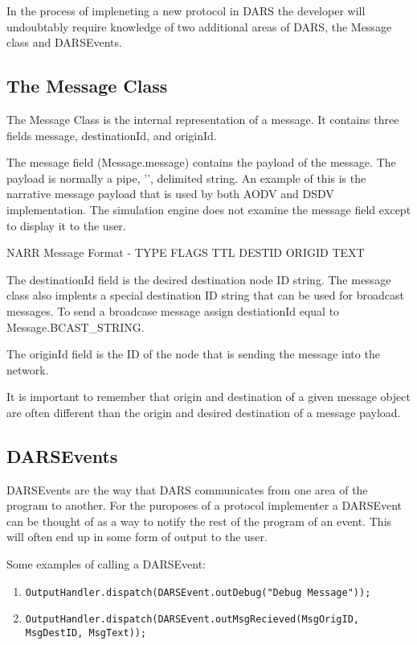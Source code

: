 \documentclass[a4paper,11pt,titlepage]{article}
\begin{document}
In the process of impleneting a new protocol in DARS the developer will undoubtably require knowledge of two additional areas of DARS, the Message class and DARSEvents.

\subsection{The Message Class}
The Message Class is the internal representation of a message. It contains three fields message, destinationId, and originId.

The message field (Message.message) contains the payload of the message. The payload is normally a pipe, '\textbar', delimited string. An example of this is the narrative message payload that is used by both AODV and DSDV implementation. The simulation engine does not examine the message field except to display it to the user.

\begin{center}
NARR Message Format - TYPE \textbar FLAGS \textbar TTL \textbar DESTID \textbar ORIGID \textbar TEXT
\end{center}

The destinationId field is the desired destination node ID string. The message class also implents a special destination ID string that can be used for broadcast messages. To send a broadcase message assign destiationId equal to Message.BCAST\_STRING.

The originId field is the ID of the node that is sending the message into the network.

It is important to remember that origin and destination of a given message object are often different than the origin and desired destination of a message payload.

\subsection{DARSEvents}
DARSEvents are the way that DARS communicates from one area of the program to another. For the puroposes of a protocol implementer a DARSEvent can be thought of as a way to notify the rest of the program of an event. This will often end up in some form of output to the user.

Some examples of calling a DARSEvent:

\begin{enumerate}
   \item[] \texttt{OutputHandler.dispatch(DARSEvent.outDebug("Debug Message"));}

   \item[] \texttt{OutputHandler.dispatch(DARSEvent.outMsgRecieved(MsgOrigID, MsgDestID, MsgText));}
\end{enumerate}
\end{document}
